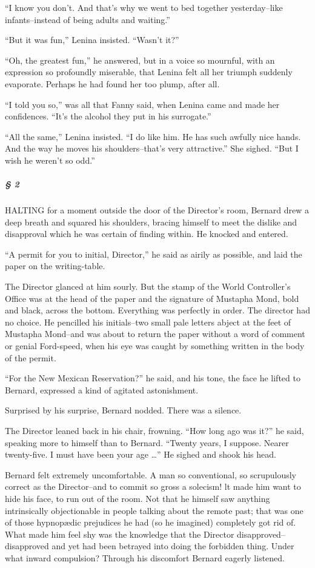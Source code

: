 \documentclass[12pt]{report}
\begin{document}
``I know you don't. And that's why we went to bed together
yesterday--like infants--instead of being adults and waiting.''

``But it was fun,'' Lenina insisted. ``Wasn't it?''

``Oh, the greatest fun,'' he answered, but in a voice so mournful, with
an expression so profoundly miserable, that Lenina felt all her triumph
suddenly evaporate. Perhaps he had found her too plump, after all.

``I told you so,'' was all that Fanny said, when Lenina came and made
her confidences. ``It's the alcohol they put in his surrogate.''

``All the same,'' Lenina insisted. ``I do like him. He has such awfully
nice hands. And the way he moves his shoulders--that's very
attractive.'' She sighed. ``But I wish he weren't so odd.''

\mbox{}%
\subparagraph{§ 2}\label{section}

HALTING for a moment outside the door of the Director's room, Bernard
drew a deep breath and squared his shoulders, bracing himself to meet
the dislike and disapproval which he was certain of finding within. He
knocked and entered.

``A permit for you to initial, Director,'' he said as airily as
possible, and laid the paper on the writing-table.

The Director glanced at him sourly. But the stamp of the World
Controller's Office was at the head of the paper and the signature of
Mustapha Mond, bold and black, across the bottom. Everything was
perfectly in order. The director had no choice. He pencilled his
initials--two small pale letters abject at the feet of Mustapha
Mond--and was about to return the paper without a word of comment or
genial Ford-speed, when his eye was caught by something written in the
body of the permit.

``For the New Mexican Reservation?'' he said, and his tone, the face he
lifted to Bernard, expressed a kind of agitated astonishment.

Surprised by his surprise, Bernard nodded. There was a silence.

The Director leaned back in his chair, frowning. ``How long ago was
it?'' he said, speaking more to himself than to Bernard. ``Twenty years,
I suppose. Nearer twenty-five. I must have been your age \ldots{}'' He
sighed and shook his head.

Bernard felt extremely uncomfortable. A man so conventional, so
scrupulously correct as the Director--and to commit so gross a solecism!
lt made him want to hide his face, to run out of the room. Not that he
himself saw anything intrinsically objectionable in people talking about
the remote past; that was one of those hypnopædic prejudices he had (so
he imagined) completely got rid of. What made him feel shy was the
knowledge that the Director disapproved--disapproved and yet had been
betrayed into doing the forbidden thing. Under what inward compulsion?
Through his discomfort Bernard eagerly listened.
\end{document}
